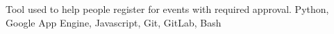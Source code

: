 {Tool used to help people register for events with required approval.}
{Python, Google App Engine, Javascript, Git, GitLab, Bash}
